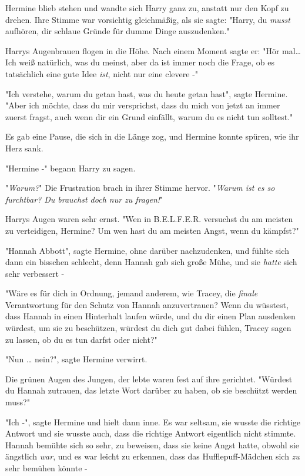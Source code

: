{Hermine blieb stehen und wandte sich Harry ganz zu, anstatt nur den Kopf zu drehen. Ihre Stimme war vorsichtig gleichmäßig, als sie sagte: "Harry, du \emph{musst} aufhören, dir schlaue Gründe für dumme Dinge auszudenken."

Harrys Augenbrauen flogen in die Höhe. Nach einem Moment sagte er: "Hör mal… Ich weiß natürlich, was du meinst, aber da ist immer noch die Frage, ob es tatsächlich eine gute Idee \emph{ist}, nicht nur eine clevere -"

"Ich verstehe, warum du getan hast, was du heute getan hast", sagte Hermine. "Aber ich möchte, dass du mir versprichst, dass du mich von jetzt an immer zuerst fragst, auch wenn dir ein Grund einfällt, warum du es nicht tun solltest."

Es gab eine Pause, die sich in die Länge zog, und Hermine konnte spüren, wie ihr Herz sank.

"Hermine -" begann Harry zu sagen.

"\emph{Warum?}" Die Frustration brach in ihrer Stimme hervor. "\emph{Warum ist es so furchtbar? Du brauchst doch nur zu fragen!}"

Harrys Augen waren sehr ernst. "Wen in B.E.L.F.E.R. versuchst du am meisten zu verteidigen, Hermine? Um wen hast du am meisten Angst, wenn du kämpfst?"

"Hannah Abbott", sagte Hermine, ohne darüber nachzudenken, und fühlte sich dann ein bisschen schlecht, denn Hannah gab sich große Mühe, und sie \emph{hatte} sich sehr verbessert -

"Wäre es für dich in Ordnung, jemand anderem, wie Tracey, die \emph{finale} Verantwortung für den Schutz von Hannah anzuvertrauen? Wenn du wüsstest, dass Hannah in einen Hinterhalt laufen würde, und du dir einen Plan ausdenken würdest, um sie zu beschützen, würdest du dich gut dabei fühlen, Tracey sagen zu lassen, ob du es tun darfst oder nicht?"

"Nun … nein?", sagte Hermine verwirrt.

Die grünen Augen des Jungen, der lebte waren fest auf ihre gerichtet. "Würdest du Hannah zutrauen, das letzte Wort darüber zu haben, ob sie beschützt werden muss?"

"Ich -", sagte Hermine und hielt dann inne. Es war seltsam, sie wusste die richtige Antwort und sie wusste auch, dass die richtige Antwort eigentlich nicht stimmte. Hannah bemühte sich so sehr, zu beweisen, dass sie keine Angst hatte, obwohl sie ängstlich \emph{war}, und es war leicht zu erkennen, dass das Hufflepuff-Mädchen sich \emph{zu} sehr bemühen könnte -

}
